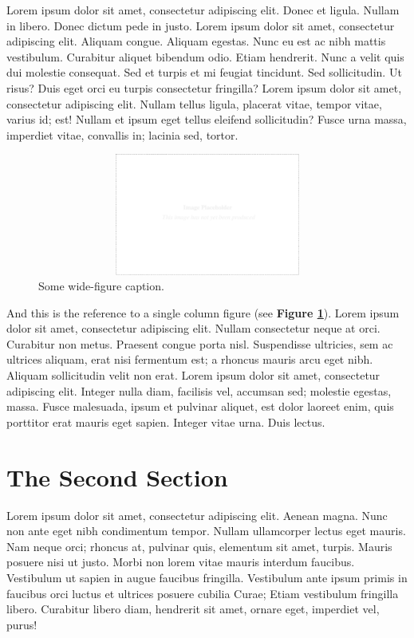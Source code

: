 \documentclass[a4paper,10pt]{article}
\begin{document}
\begin{multicols}{2}
Lorem ipsum dolor sit amet, consectetur adipiscing elit. Donec et ligula. Nullam
in libero. Donec dictum pede in justo. Lorem ipsum dolor sit amet, consectetur
adipiscing elit. Aliquam congue. Aliquam egestas. Nunc eu est ac nibh mattis
vestibulum. Curabitur aliquet bibendum odio. Etiam hendrerit. Nunc a velit quis
dui molestie consequat. Sed et turpis et mi feugiat tincidunt. Sed sollicitudin.
Ut risus? Duis eget orci eu turpis consectetur fringilla? Lorem ipsum dolor sit
amet, consectetur adipiscing elit. Nullam tellus ligula, placerat vitae, tempor
vitae, varius id; est! Nullam et ipsum eget tellus eleifend sollicitudin? Fusce
urna massa, imperdiet vitae, convallis in; lacinia sed, tortor.

\begin{figure}[t]
  \centering
 \includegraphics[width=16cm, height=4cm]{./eps/placeholder.eps}
 \caption{Some wide-figure caption.}
 \label{fig:myfigure2}
\end{figure}

And this is the reference to a single column figure (see {\bf Figure
\ref{fig:myfigure2}}). Lorem ipsum dolor sit amet, consectetur adipiscing elit.
Nullam consectetur neque at orci. Curabitur non metus. Praesent congue porta
nisl. Suspendisse ultricies, sem ac ultrices aliquam, erat nisi fermentum est; a
rhoncus mauris arcu eget nibh. Aliquam sollicitudin velit non erat. Lorem ipsum
dolor sit amet, consectetur adipiscing elit. Integer nulla diam, facilisis vel,
accumsan sed; molestie egestas, massa. Fusce malesuada, ipsum et pulvinar
aliquet, est dolor laoreet enim, quis porttitor erat mauris eget sapien. Integer
vitae urna. Duis lectus.

\section{The Second Section}

Lorem ipsum dolor sit amet, consectetur adipiscing elit.  Aenean magna. Nunc non
ante eget nibh condimentum tempor. Nullam ullamcorper lectus eget mauris. Nam
neque orci; rhoncus at, pulvinar quis, elementum sit amet, turpis. Mauris
posuere nisi ut justo. Morbi non lorem vitae mauris interdum faucibus.
Vestibulum ut sapien in augue faucibus fringilla. Vestibulum ante ipsum primis
in faucibus orci luctus et ultrices posuere cubilia Curae; Etiam vestibulum
fringilla libero. Curabitur libero diam, hendrerit sit amet, ornare eget,
imperdiet vel, purus!



\end{multicols}
\end{document}
